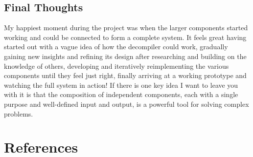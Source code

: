 \documentclass[12pt, a4paper]{article}
\begin{document}
\subsection{Final Thoughts}

My happiest moment during the project was when the larger components started working and could be connected to form a complete system. It feels great having started out with a vague idea of how the decompiler could work, gradually gaining new insights and refining its design after researching and building on the knowledge of others, developing and iteratively reimplementing the various components until they feel just right, finally arriving at a working prototype and watching the full system in action! If there is one key idea I want to leave you with it is that the composition of independent components, each with a single purpose and well-defined input and output, is a powerful tool for solving complex problems.

\pagebreak



\section{References}

\renewcommand{\refname}{\vskip -1cm}

\end{document}
